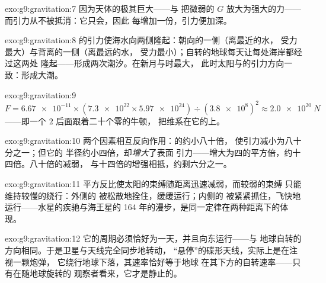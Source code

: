 \begin{solution}{exo:g9:gravitation:7}
因为天体的极其巨大——与
把微弱的 $G$ 放大为强大的力——
而引力从不被抵消：它只会，因此
每增加一份，引力便加深。
\end{solution}

\begin{solution}{exo:g9:gravitation:8}
的引力使海水向两侧隆起：朝向的一侧（离最近的水，
受力最大）与背离的一侧（离最远的水，
受力最小）；自转的地球每天让每处海岸都经过这两处
隆起——形成两次潮汐。在新月与时最大，
此时太阳与的引力方向一致：形成大潮。
\end{solution}

\begin{solution}{exo:g9:gravitation:9}
$F = \num{6.67e-11} \times (\num{7.3e22} \times
\num{5.97e24}) \div (\num{3.8e8})^2 \approx \qty{2.0e20}{N}$
——即一个 $2$ 后面跟着二十个零的牛顿，
把维系在它的上。
\end{solution}

\begin{solution}{exo:g9:gravitation:10}
两个因素相互反向作用：的约小八十倍，
使引力减小为八十分之一；但它的
半径约小四倍，却\emph{增大}了表面
引力——增大为四的平方倍，约十四倍。八十倍的减弱，
与十四倍的增强相抵，约剩六分之一。
\end{solution}

\begin{solution}{exo:g9:gravitation:11}
平方反比使太阳的束缚随距离迅速减弱，而较弱的束缚
只能维持较慢的绕行：外侧的
被松散地拴住，缓缓运行；内侧的
被紧紧抓住，飞快地运行——水星的疾驰与海王星的
164 年的漫步，是同一定律在两种距离下的体现。
\end{solution}

\begin{solution}{exo:g9:gravitation:12}
它的周期必须恰好为一天，并且向东运行——与
地球自转的方向相同。于是卫星与天线完全同步地转动，
“悬停”的碟形天线，实际上是在注视一颗炮弹，
它绕行地球下落，其速率恰好等于地球
在其下方的自转速率——只有在随地球旋转的
观察者看来，它才是静止的。
\end{solution}

